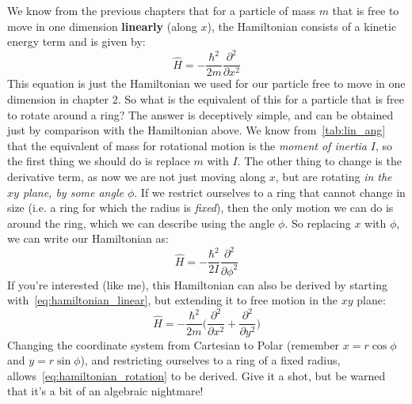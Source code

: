 \documentclass{memoir}[11pt,oneside,a4paper,openany]
\begin{document}
We know from the previous chapters that for a particle of mass $m$ that is free to move in one dimension \textbf{linearly} (along $x$), the Hamiltonian consists of a kinetic energy term and is given by:
\begin{equation}\label{eq:hamiltonian_linear}
	\hat{H} = -\frac{\hbar^2}{2m}\frac{\partial^2}{\partial x^2}
\end{equation}
This equation is just the Hamiltonian we used for our particle free to move in one dimension in chapter 2. So what is the equivalent of this for a particle that is free to rotate around a ring? The answer is deceptively simple, and can be obtained just by comparison with the Hamiltonian above. We know from~\autoref{tab:lin_ang} that the equivalent of mass for rotational motion is the \emph{moment of inertia} $I$, so the first thing we should do is replace $m$ with $I$. The other thing to change is the derivative term, as now we are not just moving along $x$, but are rotating \emph{in the $xy$ plane, by some angle $\phi$}. If we restrict ourselves to a ring that cannot change in size (i.e. a ring for which the radius is \emph{fixed}), then the only motion we can do is around the ring, which we can describe using the angle $\phi$. So replacing $x$ with $\phi$, we can write our Hamiltonian as:
\begin{equation}\label{eq:hamiltonian_rotation}
	\hat{H} = -\frac{\hbar^2}{2I}\frac{\partial^2}{\partial \phi^2}
\end{equation}
If you're interested (like me), this Hamiltonian can also be derived by starting with~\autoref{eq:hamiltonian_linear}, but extending it to free motion in the $xy$ plane:
\begin{equation}
	\hat{H} = -\frac{\hbar^2}{2m}\bigg(\frac{\partial^2}{\partial x^2} + \frac{\partial^2}{\partial y^2}\bigg)
\end{equation}
Changing the coordinate system from Cartesian to Polar (remember $x = r\cos\phi$ and $y = r\sin\phi$), and restricting ourselves to a ring of a fixed radius, allows~\autoref{eq:hamiltonian_rotation} to be derived. Give it a shot, but be warned that it's a bit of an algebraic nightmare!
\end{document}
